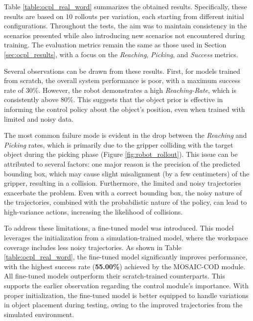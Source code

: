 Table \ref{table:ocpl_real_word} summarizes the obtained results. Specifically, these results are based on 10 rollouts per variation, each starting from different initial configurations. Throughout the tests, the aim was to maintain consistency in the scenarios presented while also introducing new scenarios not encountered during training. The evaluation metrics remain the same as those used in Section \ref{sec:ocpl_results}, with a focus on the \textit{Reaching}, \textit{Picking}, and \textit{Success} metrics.


Several observations can be drawn from these results. First, for models trained from scratch, the overall system performance is poor, with a maximum success rate of 30\%. However, the robot demonstrates a high \textit{Reaching-Rate}, which is consistently above 80\%. This suggests that the object prior is effective in informing the control policy about the object's position, even when trained with limited and noisy data. 

The most common failure mode is evident in the drop between the \textit{Reaching} and \textit{Picking} rates, which is primarily due to the gripper colliding with the target object during the picking phase (Figure \ref{fig:robot_rollout}). This issue can be attributed to several factors: one major reason is the precision of the predicted bounding box, which may cause slight misalignment (by a few centimeters) of the gripper, resulting in a collision. Furthermore, the limited and noisy trajectories exacerbate the problem. Even with a correct bounding box, the noisy nature of the trajectories, combined with the probabilistic nature of the policy, can lead to high-variance actions, increasing the likelihood of collisions.


To address these limitations, a fine-tuned model was introduced. This model leverages the initialization from a simulation-trained model, where the workspace coverage includes less noisy trajectories. As shown in Table \ref{table:ocpl_real_word}, the fine-tuned model significantly improves performance, with the highest success rate (\textbf{55.00\%}) achieved by the MOSAIC-COD module. All fine-tuned models outperform their scratch-trained counterparts. This supports the earlier observation regarding the control module's importance. With proper initialization, the fine-tuned model is better equipped to handle variations in object placement during testing, owing to the improved trajectories from the simulated environment.

